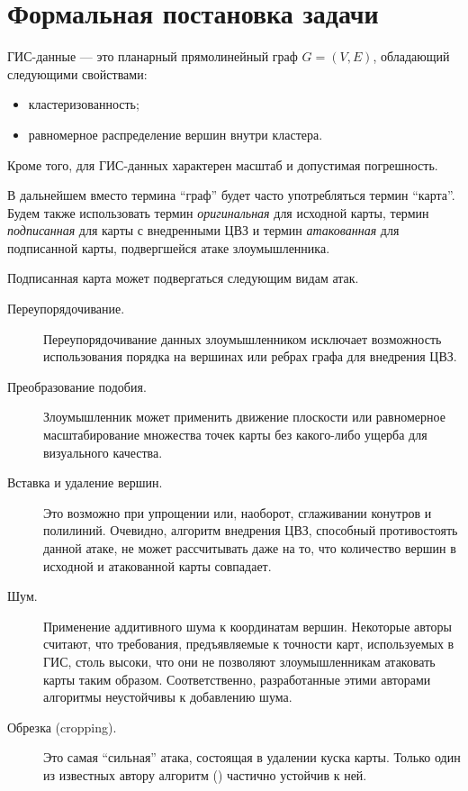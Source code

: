 \section{Формальная постановка задачи}
\label{sec:prob_def}

ГИС-данные --- это планарный прямолинейный граф $G = (V, E)$, обладающий следующими свойствами:
\begin{itemize}
    \item кластеризованность;
    \item равномерное распределение вершин внутри кластера.
\end{itemize}
Кроме того, для ГИС-данных характерен масштаб и допустимая погрешность.

В дальнейшем вместо термина ``граф'' будет часто употребляться термин ``карта''. Будем также использовать термин 
\textit{оригинальная} для исходной карты, термин \textit{подписанная} для карты с внедренными 
ЦВЗ и термин \textit{атакованная} для подписанной карты, подвергшейся атаке злоумышленника.

Подписанная карта может подвергаться следующим видам атак.
\begin{description}
    \item[Переупорядочивание.] Переупорядочивание данных злоумышленником исключает возможность 
    использования порядка на вершинах или ребрах графа для внедрения ЦВЗ.
    \item[Преобразование подобия.] Злоумышленник может применить движение плоскости или 
    равномерное масштабирование множества точек карты без какого-либо ущерба для визуального качества. 
    \item[Вставка и удаление вершин.] Это возможно при упрощении или, наоборот, сглаживании конутров и полилиний. 
    Очевидно, алгоритм внедрения ЦВЗ, способный противостоять данной атаке, не может рассчитывать даже на то, что количество вершин в исходной и атакованной карты совпадает.
    \item[Шум.] Применение аддитивного шума к координатам вершин. Некоторые авторы \cite{Kim, Shao, Bazin} считают, 
    что требования, предъявляемые к точности карт, используемых в ГИС, столь высоки, что они не позволяют злоумышленникам атаковать карты таким образом.
    Соответственно, разработанные этими авторами алгоритмы неустойчивы к добавлению шума.
    \item[Обрезка (cropping).] Это самая ``сильная'' атака, состоящая в удалении куска карты. 
    Только один из известных автору алгоритм (\cite{Ohbuchi}) частично устойчив к ней.
\end{description}  

